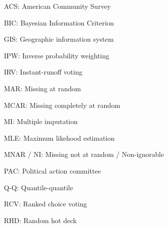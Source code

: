 \documentclass[12pt,twoside]{reedthesis}
\begin{document}
  \begin{abbrevs}
    \noindent ACS: American Community Survey
    
    \par
    
    \noindent BIC: Bayesian Information Criterion
    
    \par
    
    \noindent GIS: Geographic information system
    
    \par
    
    \noindent IPW: Inverse probability weighting
    
    \par
    
    \noindent IRV: Instant-runoff voting
    
    \par
    
    \noindent MAR: Missing at random
    
    \par
    
    \noindent MCAR: Missing completely at random
    
    \par
    
    \noindent MI: Multiple imputation
    
    \par
    
    \noindent MLE: Maximum likehood estimation
    
    \par
    
    \noindent MNAR / NI: Missing not at random / Non-ignorable
    
    \par
    
    \noindent PAC: Political action committee
    
    \par
    
    \noindent Q-Q: Quantile-quantile
    
    \par
    
    \noindent RCV: Ranked choice voting
    
    \par
    
    \noindent RHD: Random hot deck
    
    \par
    

\end{abbrevs}
\end{document}
